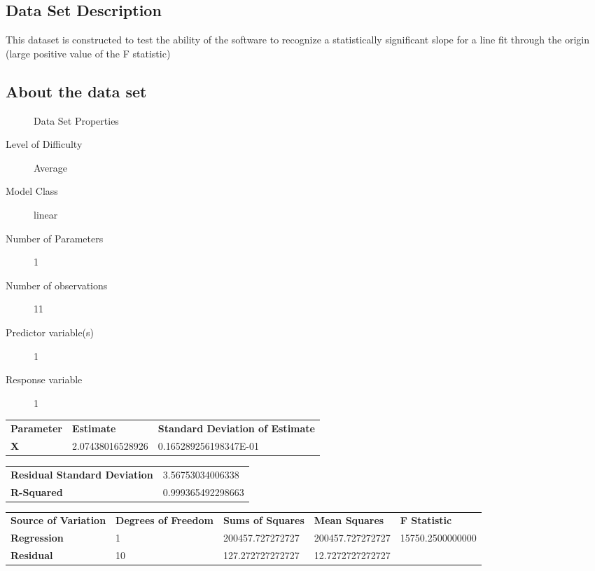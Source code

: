 \documentclass[10pt]{article}
\begin{document}
\subsection*{Data Set Description}
This dataset is constructed to test the ability of the software to recognize a 
statistically significant slope for a line fit through the origin (large positive 
value of the F statistic)

\subsection*{About the data set}

\begin{description}
   \item[]Data Set Properties
   \item[Level of Difficulty] Average
   \item[Model Class] linear
   \item[Number of Parameters] 1
   \item[Number of observations] 11
   \item[Predictor variable(s)] 1
   \item[Response variable] 1
\end{description}

\begin{tabular}{lll}
   \textbf{Parameter} & \textbf{Estimate} & \textbf{Standard Deviation of Estimate}  \\ 
	 \textbf{X} &  2.07438016528926 &  0.165289256198347E-01  \\ 
\end{tabular} 

\begin{tabular}{ll}
    \textbf{Residual Standard Deviation} &  3.56753034006338  \\ 
    \textbf{R-Squared} & 0.999365492298663   \\  
\end{tabular}


\begin{tabular}{lllll}
   \textbf{Source of Variation} & \textbf{Degrees of Freedom} & \textbf{Sums of Squares} & \textbf{Mean Squares}  & \textbf{F Statistic} \\ 
   \textbf{Regression} & 1 & 200457.727272727 & 200457.727272727 & 15750.2500000000 \\ 
	\textbf{Residual} & 10 & 127.272727272727 & 12.7272727272727 &  \\ 
\end{tabular} 
\end{document}
